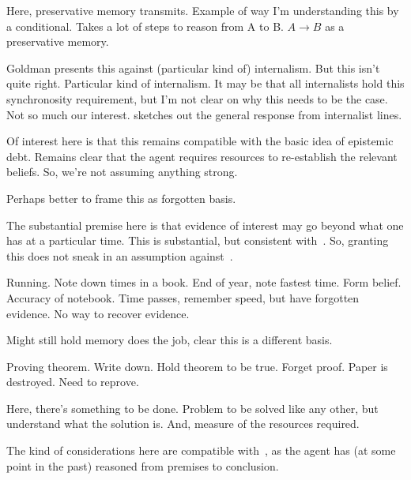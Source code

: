 \begin{note}
  Here, preservative memory transmits.
  Example of way I'm understanding this by a conditional.
  Takes a lot of steps to reason from A to B.
  \(A \rightarrow B\) as a preservative memory.

  Goldman presents this against (particular kind of) internalism.
  But this isn't quite right.
  Particular kind of internalism.
  It may be that all internalists hold this synchronosity requirement, but I'm not clear on why this needs to be the case.
  Not so much our interest.
  \cite{Korcz:2019tl} sketches out the general response from internalist lines.

  Of interest here is that this remains compatible with the basic idea of epistemic debt.
  Remains clear that the agent requires resources to re-establish the relevant beliefs.
  So, we're not assuming anything strong.

  Perhaps better to frame this as forgotten basis.
\end{note}

\begin{note}
  The substantial premise here is that evidence of interest may go beyond what one has at a particular time.
  This is substantial, but consistent with~\uRa{}.
  So, granting this does not sneak in an assumption against~\uRa{}.
\end{note}

\begin{note}
  Running.
  Note down times in a book.
  End of year, note fastest time.
  Form belief.
  Accuracy of notebook.
  Time passes, remember speed, but have forgotten evidence.
  No way to recover evidence.

  Might still hold memory does the job, clear this is a different basis.
\end{note}

\begin{note}
  Proving theorem.
  Write down.
  Hold theorem to be true.
  Forget proof.
  Paper is destroyed.
  Need to reprove.

  Here, there's something to be done.
  Problem to be solved like any other, but understand what the solution is.
  And, measure of the resources required.
\end{note}

\begin{note}[~\uRa{}]
  The kind of considerations here are compatible with~\uRa{}, as the agent has (at some point in the past) reasoned from premises to conclusion.
\end{note}

